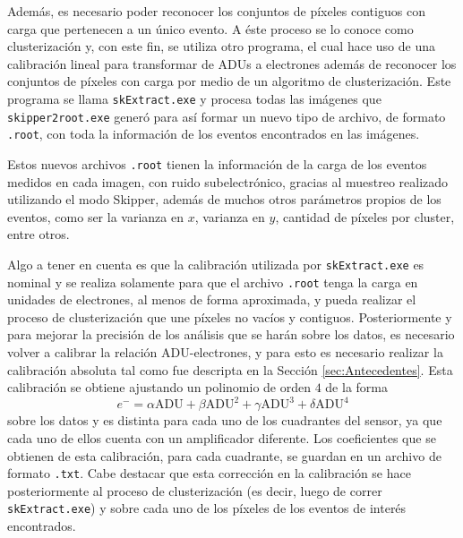 
Además, es necesario poder reconocer los conjuntos de píxeles contiguos con carga que pertenecen a un único evento. A éste proceso se lo conoce como clusterización y, con este fin, se utiliza otro programa, el cual hace uso de una calibración lineal para transformar de ADUs a electrones además de reconocer los conjuntos de píxeles con carga por medio de un algoritmo de clusterización. Este programa se llama \verb|skExtract.exe| y procesa todas las imágenes que \verb|skipper2root.exe| generó para así formar un nuevo tipo de archivo, de formato \verb|.root|, con toda la información de los eventos encontrados en las imágenes. 

Estos nuevos archivos \verb|.root| tienen la información de la carga de los eventos medidos en cada imagen, con ruido subelectrónico, gracias al muestreo realizado utilizando el modo Skipper, además de muchos otros parámetros propios de los eventos, como ser la varianza en $x$, varianza en $y$, cantidad de píxeles por cluster, entre otros.

Algo a tener en cuenta es que la calibración utilizada por \verb|skExtract.exe| es nominal y se realiza solamente para que el archivo \verb|.root| tenga la carga en unidades de electrones, al menos de forma aproximada, y pueda realizar el proceso de clusterización que une píxeles no vacíos y contiguos. Posteriormente y para mejorar la precisión de los análisis que se harán sobre los datos, es necesario volver a calibrar la relación ADU-electrones, y para esto es necesario realizar la calibración absoluta tal como fue descripta en la Sección \ref{sec:Antecedentes}. Esta calibración se obtiene ajustando un polinomio de orden $4$ de la forma
\begin{equation*}
    e^{-} 
    = \alpha \mbox{ADU} 
    + \beta \mbox{ADU}^{2}
    + \gamma \mbox{ADU}^{3}
    + \delta \mbox{ADU}^{4}
\end{equation*}
sobre los datos y es distinta para cada uno de los cuadrantes del sensor, ya que cada uno de ellos cuenta con un amplificador diferente. Los coeficientes que se obtienen de esta calibración, para cada cuadrante, se guardan en un archivo de formato \verb|.txt|. Cabe destacar que esta corrección en la calibración se hace posteriormente al proceso de clusterización (es decir, luego de correr \verb|skExtract.exe|) y sobre cada uno de los píxeles de los eventos de interés encontrados.

